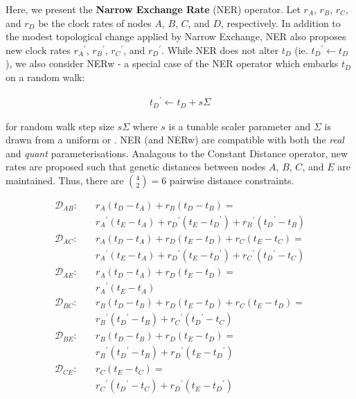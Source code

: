 \documentclass[10pt,letterpaper]{article}
\begin{document}


Here, we present the \textbf{Narrow Exchange Rate} (NER) operator. Let $r_A$, $r_B$, $r_C$, and $r_D$ be the clock rates of nodes $A$, $B$, $C$, and $D$, respectively. In addition to the modest topological change applied by Narrow Exchange, NER also proposes new clock rates ${r_A}^\prime$, ${r_B}^\prime$, ${r_C}^\prime$, and ${r_D}^\prime$. While NER does not alter $t_D$ (ie. ${t_D}^\prime \leftarrow t_D$), we also consider NERw - a special case of the NER operator which embarks $t_D$ on a random walk:

\begin{align}
	{t_D}^\prime \leftarrow t_D + s\Sigma
\end{align}

for random walk step size $s\Sigma$ where $s$ is a tunable scaler parameter and $\Sigma$ is drawn from a uniform or \textbf{}. NER (and NERw) are compatible with both the \textit{real} and \textit{quant} parameterisations. Analagous to the Constant Distance operator, new rates are proposed such that genetic distances between nodes $A$, $B$, $C$, and $E$ are maintained. Thus, there are $\binom{4}{2} = 6$ pairwise distance constraints.


\begin{align}
	\mathcal{D}_{AB}: \quad & r_A  (t_D - t_A) + r_B  (t_D - t_B) = \nonumber \\
					 & {r_A}^\prime  (t_E - t_A) + {r_D}^\prime  (t_E - {t_D}^\prime) + {r_B}^\prime ({t_D}^\prime - t_B) \\
	\mathcal{D}_{AC}: \quad & r_A  (t_D - t_A) + r_D  (t_E - t_D) + r_C  (t_E - t_C) = \nonumber \\
				 	  & {r_A}^\prime  (t_E - t_A) + {r_D}^\prime  (t_E - {t_D}^\prime) + {r_C}^\prime ({t_D}^\prime - t_C) \\
 	\mathcal{D}_{AE}: \quad & r_A  (t_D - t_A) + r_D  (t_E - t_D)= \nonumber \\
					  & {r_A}^\prime  (t_E - t_A) \\
  	\mathcal{D}_{BC}: \quad & r_B  (t_D - t_B) + r_D  (t_E - t_D) + r_C  (t_E - t_D)= \nonumber \\
					  & {r_B}^\prime ({t_D}^\prime - t_B) + {r_C}^\prime ({t_D}^\prime - t_C) \\
   	\mathcal{D}_{BE}: \quad & r_B  (t_D - t_B) + r_D  (t_E - t_D)= \nonumber \\
					  & {r_B}^\prime ({t_D}^\prime - t_B) + {r_D}^\prime (t_E - {t_D}^\prime) \\
	\mathcal{D}_{CE}: \quad & r_C  (t_E - t_C)= \nonumber \\
					  & {r_C}^\prime ({t_D}^\prime - t_C) + {r_D}^\prime (t_E - {t_D}^\prime) 
\end{align}
\end{document}
